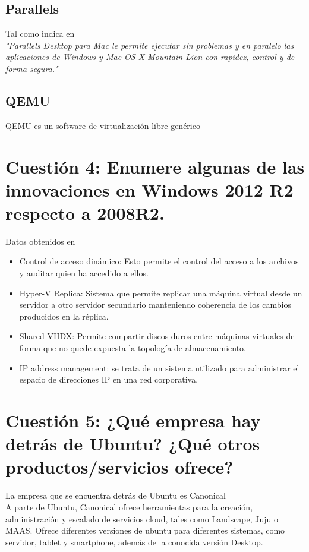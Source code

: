 \subsection{Parallels}
Tal como indica en \cite{10} \\
\textit{"Parallels Desktop para Mac le permite ejecutar sin problemas y en paralelo las aplicaciones de Windows y Mac OS X Mountain Lion con rapidez, control y de forma segura."}

\subsection{QEMU}
QEMU es un software de virtualización libre genérico \cite{11}

\section{Cuestión 4: Enumere algunas de las innovaciones en Windows 2012 R2 respecto a 2008R2.}

Datos obtenidos en \cite{12}

\begin{itemize}
\item Control de acceso dinámico: Esto permite el control del acceso a los archivos y auditar quien ha accedido a ellos.
\cite{13}
\item Hyper-V Replica: Sistema que permite replicar una máquina virtual desde un servidor a otro servidor secundario manteniendo coherencia de los cambios producidos en la réplica.\cite{14}
\item Shared VHDX: Permite compartir discos duros entre máquinas virtuales de forma que no quede expuesta la topología de almacenamiento. \cite{15}
\item IP address management: se trata de un sistema utilizado para administrar el espacio de direcciones IP en una red corporativa. \cite{16}
\end{itemize}

\newpage

\section{Cuestión 5: ¿Qué empresa hay detrás de Ubuntu? ¿Qué otros productos/servicios ofrece?}

La empresa que se encuentra detrás de Ubuntu es Canonical \cite{17} \\
A parte de Ubuntu, Canonical ofrece herramientas para la creación, administración y escalado de servicios cloud, tales como Landscape, Juju o MAAS. Ofrece diferentes versiones de ubuntu para diferentes sistemas, como servidor, tablet y smartphone, además de la conocida versión Desktop. \cite{18}

